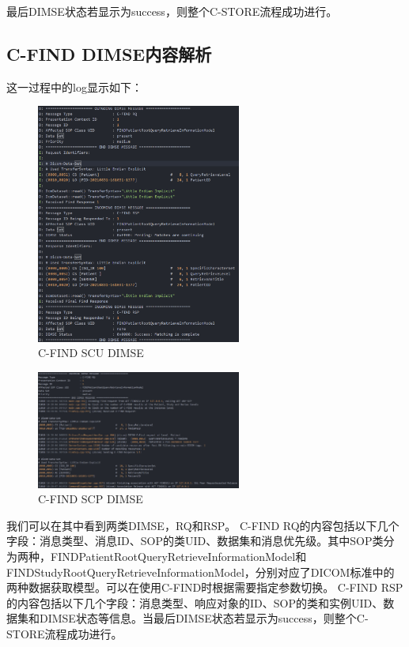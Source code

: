 \documentclass[UTF8]{ctexart}
\begin{document}
最后DIMSE状态若显示为success，则整个C-STORE流程成功进行。

\subsection{C-FIND DIMSE内容解析}
这一过程中的log显示如下：
\begin{figure}[H]
    \centering
    \includegraphics[width=0.6\textwidth]{find_DIMSE_scu.png}
    \caption{C-FIND SCU DIMSE}
\end{figure}

\begin{figure}[H]
    \centering
    \includegraphics[width=0.6\textwidth]{find_DIMSE_scp.png}
    \caption{C-FIND SCP DIMSE}
\end{figure}
我们可以在其中看到两类DIMSE，RQ和RSP。
C-FIND RQ的内容包括以下几个字段：消息类型、消息ID、SOP的类UID、数据集和消息优先级。其中SOP类分为两种，FINDPatientRootQueryRetrieveInformationModel和FINDStudyRootQueryRetrieveInformationModel，分别对应了DICOM标准中的两种数据获取模型。可以在使用C-FIND时根据需要指定参数切换。
C-FIND RSP的内容包括以下几个字段：消息类型、响应对象的ID、SOP的类和实例UID、数据集和DIMSE状态等信息。当最后DIMSE状态若显示为success，则整个C-STORE流程成功进行。
\end{document}
